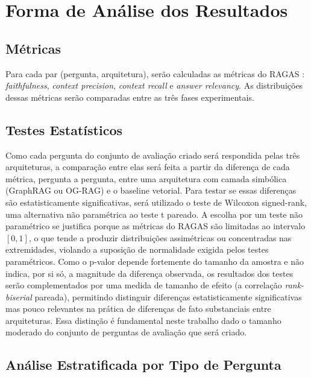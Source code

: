 \documentclass{article}
\begin{document}
\newpage

\section{Forma de Análise dos Resultados}

\subsection{Métricas}

Para cada par (pergunta, arquitetura), serão calculadas as métricas do RAGAS \cite{es-etal-2024-ragas}: \textit{faithfulness}, \textit{context precision}, \textit{context recall} e \textit{answer relevancy}. As distribuições dessas métricas serão comparadas entre as três fases experimentais.

\subsection{Testes Estatísticos}

Como cada pergunta do conjunto de avaliação criado será respondida pelas três arquiteturas, a comparação entre elas será feita a partir da diferença de cada métrica, pergunta a pergunta, entre uma arquitetura com camada simbólica (GraphRAG ou OG-RAG) e o baseline vetorial. Para testar se essas diferenças são estatisticamente significativas, será utilizado o teste de Wilcoxon signed-rank, uma alternativa não paramétrica ao teste t pareado. A escolha por um teste não paramétrico se justifica porque as métricas do RAGAS são limitadas ao intervalo $[0,1]$, o que tende a produzir distribuições assimétricas ou concentradas nas extremidades, violando a suposição de normalidade exigida pelos testes paramétricos. Como o p-valor depende fortemente do tamanho da amostra e não indica, por si só, a magnitude da diferença observada, os resultados dos testes serão complementados por uma medida de tamanho de efeito (a correlação \textit{rank-biserial} pareada), permitindo distinguir diferenças estatisticamente significativas mas pouco relevantes na prática de diferenças de fato substanciais entre arquiteturas. Essa distinção é fundamental neste trabalho dado o tamanho moderado do conjunto de perguntas de avaliação que será criado.

\subsection{Análise Estratificada por Tipo de Pergunta}
\end{document}
